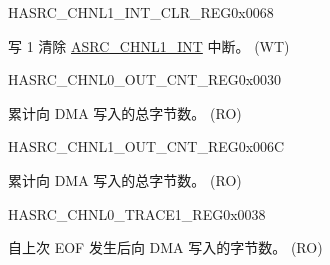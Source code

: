 \begin{register}{H}{ASRC\_CHNL1\_INT\_CLR\_REG}{0x0068}\label{regdesc:ASRCCHNL1INTCLRREG}
%
%
\regnewline%
\begin{regdesc}\begin{reglist}
\label{fielddesc:ASRCCHNL1OUTCNTEOFINTCLR}\item [ASRC\_CHNL1\_OUTCNT\_EOF\_INT\_CLR] 写 1 清除 \hyperref[int:ASRCCHNL1INT] {ASRC\_CHNL1\_INT} 中断。 (WT)
\end{reglist}\end{regdesc}
\end{register}


\begin{register}{H}{ASRC\_CHNL0\_OUT\_CNT\_REG}{0x0030}\label{regdesc:ASRCCHNL0OUTCNTREG}
%
%
\regnewline%
\begin{regdesc}\begin{reglist}
\label{fielddesc:ASRCCHNL0OUTCNT}\item [ASRC\_CHNL0\_OUT\_CNT] 累计向 DMA 写入的总字节数。 (RO)
\end{reglist}\end{regdesc}
\end{register}


\begin{register}{H}{ASRC\_CHNL1\_OUT\_CNT\_REG}{0x006C}\label{regdesc:ASRCCHNL1OUTCNTREG}
%
%
\regnewline%
\begin{regdesc}\begin{reglist}
\label{fielddesc:ASRCCHNL1OUTCNT}\item [ASRC\_CHNL1\_OUT\_CNT] 累计向 DMA 写入的总字节数。 (RO)
\end{reglist}\end{regdesc}
\end{register}


\begin{register}{H}{ASRC\_CHNL0\_TRACE1\_REG}{0x0038}\label{regdesc:ASRCCHNL0TRACE1REG}
%
%
\regnewline%
\begin{regdesc}\begin{reglist}
\label{fielddesc:ASRCCHNL0OUTINC}\item [ASRC\_CHNL0\_OUT\_INC] 自上次 EOF 发生后向 DMA 写入的字节数。 (RO)
\end{reglist}\end{regdesc}
\end{register}


